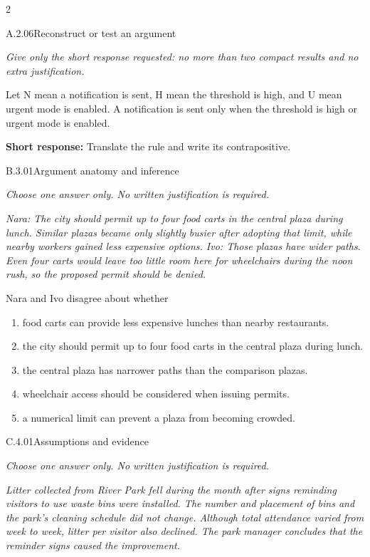 \documentclass[9pt]{extarticle}
\newcommand{\choice}[1]{\item #1}
\begin{document}
\begin{multicols}{2}
\begin{DenseCoreProblem}{A.2.06}{Reconstruct or test an argument}
{\scriptsize\textit{Give only the short response requested: no more than two compact results and no extra justification.}\par}
Let N mean a notification is sent, H mean the threshold is high, and U mean urgent mode is enabled. A notification is sent only when the threshold is high or urgent mode is enabled.

\textbf{Short response:} Translate the rule and write its contrapositive.
\end{DenseCoreProblem}
\begin{DenseCoreProblem}{B.3.01}{Argument anatomy and inference}
{\scriptsize\textit{Choose one answer only. No written justification is required.}\par}
\emph{Nara: The city should permit up to four food carts in the central plaza during lunch. Similar plazas became only slightly busier after adopting that limit, while nearby workers gained less expensive options. Ivo: Those plazas have wider paths. Even four carts would leave too little room here for wheelchairs during the noon rush, so the proposed permit should be denied.}

Nara and Ivo disagree about whether
\begin{enumerate}[label=(\alph*)]
  \choice{food carts can provide less expensive lunches than nearby restaurants.}
  \choice{the city should permit up to four food carts in the central plaza during lunch.}
  \choice{the central plaza has narrower paths than the comparison plazas.}
  \choice{wheelchair access should be considered when issuing permits.}
  \choice{a numerical limit can prevent a plaza from becoming crowded.}
\end{enumerate}
\end{DenseCoreProblem}
\columnbreak
\begin{DenseCoreProblem}{C.4.01}{Assumptions and evidence}
{\scriptsize\textit{Choose one answer only. No written justification is required.}\par}
\emph{Litter collected from River Park fell during the month after signs reminding visitors to use waste bins were installed. The number and placement of bins and the park's cleaning schedule did not change. Although total attendance varied from week to week, litter per visitor also declined. The park manager concludes that the reminder signs caused the improvement.}


\end{DenseCoreProblem}
\end{multicols}
\end{document}

